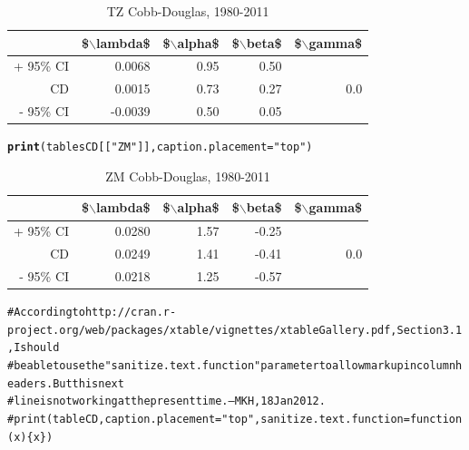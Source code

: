 \documentclass[preprint,authoryear,12pt]{elsarticle}\usepackage{graphicx, color}
\makeatletter
\newcommand{\hlfunctioncall}[1]{\textcolor[rgb]{0.501960784313725,0,0.329411764705882}{\textbf{#1}}}%
\newcommand{\hlstring}[1]{\textcolor[rgb]{0.6,0.6,1}{#1}}%
\newcommand{\hlcomment}[1]{\textcolor[rgb]{0.180392156862745,0.6,0.341176470588235}{#1}}%
\newenvironment{kframe}{%
 \def\at@end@of@kframe{}%
 \ifinner\ifhmode%
  \def\at@end@of@kframe{\end{minipage}}%
  \begin{minipage}{\columnwidth}%
 \fi\fi%
 \def\FrameCommand##1{\hskip\@totalleftmargin \hskip-\fboxsep
 \colorbox{shadecolor}{##1}\hskip-\fboxsep
     \hskip-\linewidth \hskip-\@totalleftmargin \hskip\columnwidth}%
 \MakeFramed {\advance\hsize-\width
   \@totalleftmargin\z@ \linewidth\hsize
   \@setminipage}}%
 {\par\unskip\endMakeFramed%
 \at@end@of@kframe}
\makeatother
\begin{document}
\begin{table}[ht]
\begin{center}
\caption{TZ Cobb-Douglas, 1980-2011}
\begin{tabular}{rrrrr}
  \hline
 & \$$\backslash$lambda\$ & \$$\backslash$alpha\$ & \$$\backslash$beta\$ & \$$\backslash$gamma\$ \\ 
  \hline
+ 95\% CI & 0.0068 & 0.95 & 0.50 &  \\ 
  CD & 0.0015 & 0.73 & 0.27 & 0.0 \\ 
  - 95\% CI & -0.0039 & 0.50 & 0.05 &  \\ 
   \hline
\end{tabular}
\end{center}
\end{table}
\begin{kframe}\begin{alltt}
\hlfunctioncall{print}(tablesCD[[\hlstring{"ZM"}]], caption.placement=\hlstring{"top"})
\end{alltt}
\end{kframe}%
\begin{table}[ht]
\begin{center}
\caption{ZM Cobb-Douglas, 1980-2011}
\begin{tabular}{rrrrr}
  \hline
 & \$$\backslash$lambda\$ & \$$\backslash$alpha\$ & \$$\backslash$beta\$ & \$$\backslash$gamma\$ \\ 
  \hline
+ 95\% CI & 0.0280 & 1.57 & -0.25 &  \\ 
  CD & 0.0249 & 1.41 & -0.41 & 0.0 \\ 
  - 95\% CI & 0.0218 & 1.25 & -0.57 &  \\ 
   \hline
\end{tabular}
\end{center}
\end{table}
\begin{kframe}\begin{alltt}

\hlcomment{# According to http://cran.r-project.org/web/packages/xtable/vignettes/xtableGallery.pdf, Section 3.1, I should }
\hlcomment{# be able to use the "sanitize.text.function" parameter to allow markup in column headers. But this next}
\hlcomment{# line is not working at the present time. --MKH, 18 Jan 2012.}
\hlcomment{# print(tableCD, caption.placement="top", sanitize.text.function = function(x)\{x\})}
\end{alltt}
\end{kframe}
\end{document}
